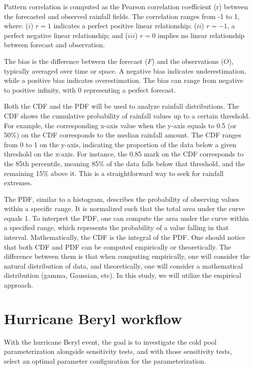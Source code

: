 Pattern correlation is computed as the Pearson correlation coefficient (r) between the forecasted and observed rainfall fields. The correlation ranges from -1 to 1, where: ($i$) $r = 1$ indicates a perfect positive linear relationship; ($ii$) $r = -1$, a perfect negative linear relationship; and ($iii$) $r = 0$ implies no linear relationship between forecast and observation.

The bias is the difference between the forecast ($F$) and the observations ($O$), typically averaged over time or space. A negative bias indicates underestimation, while a positive bias indicates overestimation. The bias can range from negative to positive infinity, with 0 representing a perfect forecast.

Both the CDF and the PDF will be used to analyze rainfall distributions. The CDF shows the cumulative probability of rainfall values up to a certain threshold. For example, the corresponding x-axis value when the y-axis equals to 0.5 (or 50\%) on the CDF corresponds to the median rainfall amount. The CDF ranges from 0 to 1 on the y-axis, indicating the proportion of the data below a given threshold on the x-axis. For instance, the 0.85 mark on the CDF corresponds to the 85th percentile, meaning 85\% of the data falls below that threshold, and the remaining 15\% above it. This is a straightforward way to seek for rainfall extremes.

The PDF, similar to a histogram, describes the probability of observing values within a specific range. It is normalized such that the total area under the curve equals 1. To interpret the PDF, one can compute the area under the curve within a specified range, which represents the probability of a value falling in that interval. Mathematically, the CDF is the integral of the PDF. One should notice that both CDF and PDF can be computed empirically or theoretically. The difference between them is that when computing empirically, one will consider the natural distribution of data, and theoretically, one will consider a mathematical distribution (gamma, Gaussian, etc). In this study, we will utilize the empirical approach.



\section{Hurricane Beryl workflow}

With the hurricane Beryl event, the goal is to investigate the cold pool parameterization alongside sensitivity tests, and with those sensitivity tests, select an optimal parameter configuration for the parameterization. 

